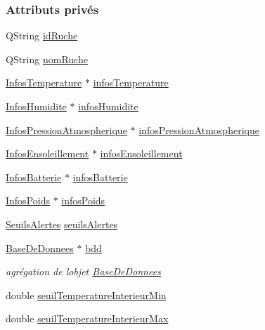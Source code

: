 \subsubsection*{Attributs privés}
\begin{DoxyCompactItemize}
\item 
Q\+String \hyperlink{class_alertes_ae3f9d7aa34ab3c83a66c8484e2b89925}{id\+Ruche}
\item 
Q\+String \hyperlink{class_alertes_a212f2a7185bcc7b11f3e54200272bdcf}{nom\+Ruche}
\item 
\hyperlink{class_infos_temperature}{Infos\+Temperature} $\ast$ \hyperlink{class_alertes_ad02b203545812ad6408befecc94ee0ec}{infos\+Temperature}
\item 
\hyperlink{class_infos_humidite}{Infos\+Humidite} $\ast$ \hyperlink{class_alertes_a7b6d798ca0629b474120cd55eb8b510c}{infos\+Humidite}
\item 
\hyperlink{class_infos_pression_atmospherique}{Infos\+Pression\+Atmospherique} $\ast$ \hyperlink{class_alertes_af4bfb245d72bc2eb080df844aa50ac86}{infos\+Pression\+Atmospherique}
\item 
\hyperlink{class_infos_ensoleillement}{Infos\+Ensoleillement} $\ast$ \hyperlink{class_alertes_abd9b6ff4e9f1df3c360374cceb8d0601}{infos\+Ensoleillement}
\item 
\hyperlink{class_infos_batterie}{Infos\+Batterie} $\ast$ \hyperlink{class_alertes_ad5c756a52ff4d6ae85cc0f03bd80582b}{infos\+Batterie}
\item 
\hyperlink{class_infos_poids}{Infos\+Poids} $\ast$ \hyperlink{class_alertes_add699ea1cebadb371f86b4c47ebe381d}{infos\+Poids}
\item 
\hyperlink{parametres_8h_aaa6de8207c94675264c90b10b613368d}{Seuils\+Alertes} \hyperlink{class_alertes_adedb6924af18a7f7a14b11ffa33db6ba}{seuils\+Alertes}
\item 
\hyperlink{class_base_de_donnees}{Base\+De\+Donnees} $\ast$ \hyperlink{class_alertes_a91e58b69d29922e8e984efb767ae5268}{bdd}
\begin{DoxyCompactList}\small\item\em agrégation de l\textquotesingle{}objet \hyperlink{class_base_de_donnees}{Base\+De\+Donnees} \end{DoxyCompactList}\item 
double \hyperlink{class_alertes_a1c970252300a177bef641ca5399d3783}{seuil\+Temperature\+Interieur\+Min}
\item 
double \hyperlink{class_alertes_abeda87298576a3b3eefcca9a96b8a0a9}{seuil\+Temperature\+Interieur\+Max}

\end{DoxyCompactItemize}

